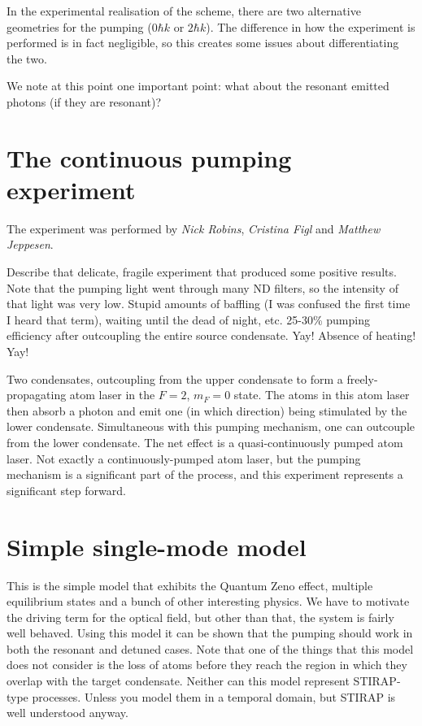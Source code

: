 In the experimental realisation of the scheme, there are two alternative geometries for the pumping ($0\hbar k$ or $2 \hbar k$).  The difference in how the experiment is performed is in fact negligible, so this creates some issues about differentiating the two.  

We note at this point one important point: what about the resonant emitted photons (if they are resonant)?

\section{The continuous pumping experiment}
\label{OpticalPumping:ContinuousExperiment}

The experiment was performed by \emph{Nick Robins}, \emph{Cristina Figl} and \emph{Matthew Jeppesen}.

Describe that delicate, fragile experiment that produced some positive results.  Note that the pumping light went through many ND filters, so the intensity of that light was very low.  Stupid amounts of baffling (I was confused the first time I heard that term), waiting until the dead of night, etc.  25-30\% pumping efficiency after outcoupling the entire source condensate. Yay! Absence of heating! Yay!

Two condensates, outcoupling from the upper condensate to form a freely-propagating atom laser in the $F=2$, $m_F=0$ state.  The atoms in this atom laser then absorb a photon and emit one (in which direction) being stimulated by the lower condensate.  Simultaneous with this pumping mechanism, one can outcouple from the lower condensate.  The net effect is a quasi-continuously pumped atom laser.  Not exactly a continuously-pumped atom laser, but the pumping mechanism is a significant part of the process, and this experiment represents a significant step forward.

\section{Simple single-mode model}
\label{OpticalPumping:SingleModeModel}

This is the simple model that exhibits the Quantum Zeno effect, multiple equilibrium states and a bunch of other interesting physics.  We have to motivate the driving term for the optical field, but other than that, the system is fairly well behaved.  Using this model it can be shown that the pumping should work in both the resonant and detuned cases.  Note that one of the things that this model does not consider is the loss of atoms before they reach the region in which they overlap with the target condensate. Neither can this model represent STIRAP-type processes. Unless you model them in a temporal domain, but STIRAP is well understood anyway.

